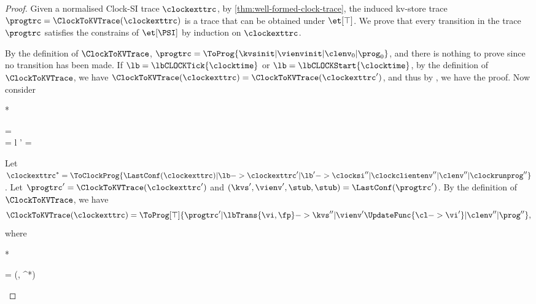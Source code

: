 \begin{proof}
Given a normalised Clock-SI trace \( \clockexttrc \),
by \cref{thm:well-formed-clock-trace}, 
the induced kv-store trace \( \progtrc = \ClockToKVTrace(\clockexttrc) \) 
is a trace that can be obtained under \( \et[\top]\).
We prove that every transition in the trace \( \progtrc \) satisfies the constrains of \( \et[\PSI] \) by induction on \( \clockexttrc \).
\begin{enumerate}
    By the definition of \( \ClockToKVTrace \),
    \( \progtrc = \ToProg{ \kvsinit | \vienvinit | \clenv_0 | \prog_0 } \),
    and there is nothing to prove since no transition has been made.
    If \( \lb  = \lbCLOCKTick{\clocktime} \) or \(  \lb = \lbCLOCKStart{\clocktime} \),
    by the definition of \( \ClockToKVTrace \),
    we have \( \ClockToKVTrace(\clockexttrc) = \ClockToKVTrace(\clockexttrc') \),
    and thus by \ih, we have the proof.
    Now consider 
    \begin{Formulae}*
    \begin{Formula}
    \clockexttrc = 
    \\ {} 
    \land \lb =  \land l \in \Set{\opR,\opW}
    \land \lb' =  
    \end{Formula}
    \end{Formulae}
    Let \( \clockexttrc^* = 
            \ToClockProg{\LastConf(\clockexttrc) | \lb 
                        -> \clockexttrc' | \lb' 
                        -> \clocksi'' | \clockclientenv'' | \clenv'' | \clockrunprog'' } \).
    Let \( \progtrc' = \ClockToKVTrace(\clockexttrc') \)
    and \( (\kvs',\vienv', \allowbreak \stub,\stub)  = \LastConf(\progtrc') \).
    By the definition of \( \ClockToKVTrace \), we have
    \[
    \ClockToKVTrace(\clockexttrc) = 
        \ToProg[\top]{\progtrc' | \lbTrans{\vi,\fp} 
                -> \kvs'' | \vienv'\UpdateFunc{\cl -> \vi'} | \clenv'' | \prog''  } ,
    \]
    where
    \begin{Formulae}*
    \begin{Formula}
        \fp = \ClockFp(\emptyset, \clockexttrc^*)

\end{Formula}
\end{Formulae}
\end{enumerate}
\end{proof}
